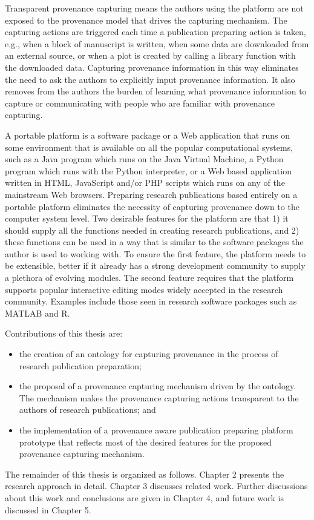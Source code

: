 Transparent provenance capturing means the authors using the platform are not exposed to the provenance model that drives the capturing mechanism. The capturing actions are triggered each time a publication preparing action is taken, e.g., when a block of manuscript is written, when some data are downloaded from an external source, or when a plot is created by calling a library function with the downloaded data. Capturing provenance information in this way eliminates the need to ask the authors to explicitly input provenance information. It also removes from the authors the burden of learning what provenance information to capture or communicating with people who are familiar with provenance capturing.

A portable platform is a software package or a Web application that runs on some environment that is available on all the popular computational systems, such as a Java program which runs on the Java Virtual Machine, a Python program which runs with the Python interpreter, or a Web based application written in HTML, JavaScript and/or PHP scripts which runs on any of the mainstream Web browsers. Preparing research publications based entirely on a portable platform eliminates the necessity of capturing provenance down to the computer system level. Two desirable features for the platform are that 1) it should supply all the functions needed in creating research publications, and 2) these functions can be used in a way that is similar to the software packages the author is used to working with. To ensure the first feature, the platform needs to be extensible, better if it already has a strong development community to supply a plethora of evolving modules. The second feature requires that the platform supports popular interactive editing modes widely accepted in the research community. Examples include those seen in research software packages such as MATLAB and R.

Contributions of this thesis are:
\begin{itemize}
\item the creation of an ontology for capturing provenance in the process of research publication preparation;
\item the proposal of a provenance capturing mechanism driven by the ontology. The mechanism makes the provenance capturing actions transparent to the authors of research publications; and 
\item the implementation of a provenance aware publication preparing platform prototype that reflects most of the desired features for the proposed provenance capturing mechanism.
\end{itemize}

The remainder of this thesis is organized as follows. Chapter 2 presents the research approach in detail. Chapter 3 discusses related work. Further discussions about this work and conclusions are given in Chapter 4, and future work is discussed in Chapter 5.
 
